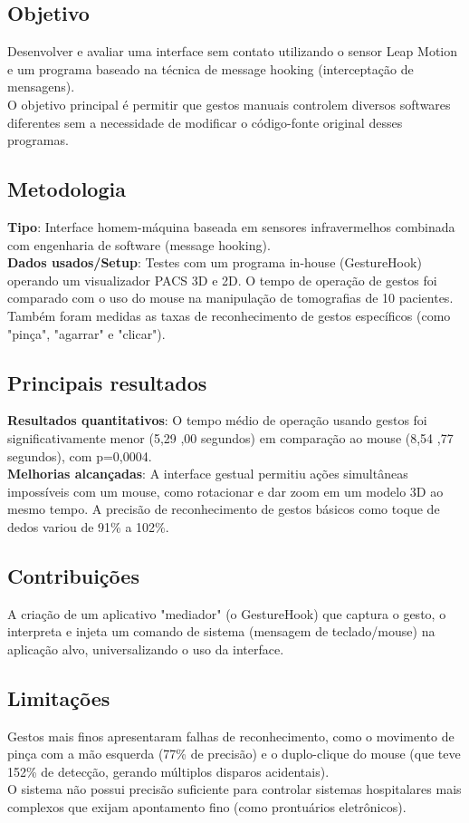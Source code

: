 \documentclass[12pt, a4paper]{article}
\begin{document}
\subsection{Objetivo}
Desenvolver e avaliar uma interface sem contato utilizando o sensor Leap Motion e um programa baseado na técnica de message hooking (interceptação de mensagens).\\
O objetivo principal é permitir que gestos manuais controlem diversos softwares diferentes sem a necessidade de modificar o código-fonte original desses programas.\\
\subsection{Metodologia}
\textbf{Tipo}: Interface homem-máquina baseada em sensores infravermelhos combinada com engenharia de software (message hooking).\\
\textbf{Dados usados/Setup}: Testes com um programa in-house (GestureHook) operando um visualizador PACS 3D e 2D. O tempo de operação de gestos foi comparado com o uso do mouse na manipulação de tomografias de 10 pacientes. Também foram medidas as taxas de reconhecimento de gestos específicos (como "pinça", "agarrar" e "clicar").\\
\subsection{Principais resultados}
\textbf{Resultados quantitativos}: O tempo médio de operação usando gestos foi significativamente menor (5,29 ,00 segundos) em comparação ao mouse (8,54 ,77 segundos), com p=0,0004.\\
\textbf{Melhorias alcançadas}: A interface gestual permitiu ações simultâneas impossíveis com um mouse, como rotacionar e dar zoom em um modelo 3D ao mesmo tempo. A precisão de reconhecimento de gestos básicos como toque de dedos variou de 91\% a 102\%.\\
\subsection{Contribuições}
A criação de um aplicativo "mediador" (o GestureHook) que captura o gesto, o interpreta e injeta um comando de sistema (mensagem de teclado/mouse) na aplicação alvo, universalizando o uso da interface.\\
\subsection{Limitações}
Gestos mais finos apresentaram falhas de reconhecimento, como o movimento de pinça com a mão esquerda (77\% de precisão) e o duplo-clique do mouse (que teve 152\% de detecção, gerando múltiplos disparos acidentais).\\
O sistema não possui precisão suficiente para controlar sistemas hospitalares mais complexos que exijam apontamento fino (como prontuários eletrônicos).\\
\end{document}
